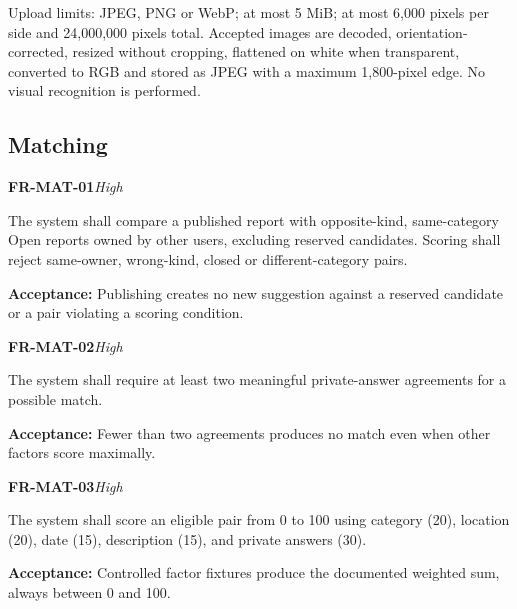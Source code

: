 \documentclass[12pt,a4paper,oneside]{report}
\begin{document}
Upload limits: JPEG, PNG or WebP; at most 5 MiB; at most 6,000 pixels per side and 24,000,000 pixels total. Accepted images are decoded, orientation-corrected, resized without cropping, flattened on white when transparent, converted to RGB and stored as JPEG with a maximum 1,800-pixel edge. No visual recognition is performed.


\subsection{Matching}

\noindent\begin{minipage}{\linewidth}\textbf{FR-MAT-01}\hfill\textit{High}\par\nopagebreak

The system shall compare a published report with opposite-kind, same-category Open reports owned by other users, excluding reserved candidates. Scoring shall reject same-owner, wrong-kind, closed or different-category pairs.

{\color{muted}\textbf{Acceptance:} Publishing creates no new suggestion against a reserved candidate or a pair violating a scoring condition.\par}\end{minipage}\par\vspace{5pt}

\noindent\begin{minipage}{\linewidth}\textbf{FR-MAT-02}\hfill\textit{High}\par\nopagebreak

The system shall require at least two meaningful private-answer agreements for a possible match.

{\color{muted}\textbf{Acceptance:} Fewer than two agreements produces no match even when other factors score maximally.\par}\end{minipage}\par\vspace{5pt}

\noindent\begin{minipage}{\linewidth}\textbf{FR-MAT-03}\hfill\textit{High}\par\nopagebreak

The system shall score an eligible pair from 0 to 100 using category (20), location (20), date (15), description (15), and private answers (30).

{\color{muted}\textbf{Acceptance:} Controlled factor fixtures produce the documented weighted sum, always between 0 and 100.\par}\end{minipage}\par\vspace{5pt}
\end{document}

